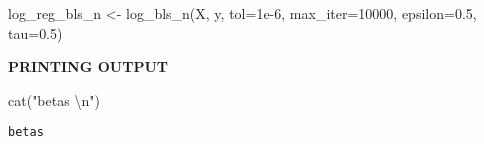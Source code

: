 \documentclass[
  letterpaper,
  DIV=11,
  numbers=noendperiod]{scrartcl}
\newenvironment{Shaded}{\begin{snugshade}}{\end{snugshade}}
\newcommand{\AttributeTok}[1]{\textcolor[rgb]{0.40,0.45,0.13}{#1}}
\newcommand{\DecValTok}[1]{\textcolor[rgb]{0.68,0.00,0.00}{#1}}
\newcommand{\FloatTok}[1]{\textcolor[rgb]{0.68,0.00,0.00}{#1}}
\newcommand{\FunctionTok}[1]{\textcolor[rgb]{0.28,0.35,0.67}{#1}}
\newcommand{\NormalTok}[1]{\textcolor[rgb]{0.00,0.23,0.31}{#1}}
\newcommand{\OtherTok}[1]{\textcolor[rgb]{0.00,0.23,0.31}{#1}}
\newcommand{\SpecialCharTok}[1]{\textcolor[rgb]{0.37,0.37,0.37}{#1}}
\newcommand{\StringTok}[1]{\textcolor[rgb]{0.13,0.47,0.30}{#1}}
\begin{document}
\begin{Shaded}
\begin{Highlighting}[]
\NormalTok{log\_reg\_bls\_n }\OtherTok{\textless{}{-}} \FunctionTok{log\_bls\_n}\NormalTok{(X, y, }\AttributeTok{tol=}\FloatTok{1e{-}6}\NormalTok{, }\AttributeTok{max\_iter=}\DecValTok{10000}\NormalTok{, }\AttributeTok{epsilon=}\FloatTok{0.5}\NormalTok{, }\AttributeTok{tau=}\FloatTok{0.5}\NormalTok{)}
\end{Highlighting}
\end{Shaded}

\textbf{PRINTING OUTPUT}

\begin{Shaded}
\begin{Highlighting}[]
\FunctionTok{cat}\NormalTok{(}\StringTok{"betas }\SpecialCharTok{\textbackslash{}n}\StringTok{"}\NormalTok{)}
\end{Highlighting}
\end{Shaded}

\begin{verbatim}
betas 
\end{verbatim}

\begin{Shaded}
\end{Shaded}
\end{document}

